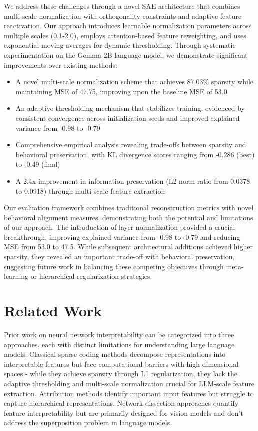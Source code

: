\documentclass{article} %
\begin{document}
We address these challenges through a novel SAE architecture that combines multi-scale normalization with orthogonality constraints and adaptive feature reactivation. Our approach introduces learnable normalization parameters across multiple scales (0.1-2.0), employs attention-based feature reweighting, and uses exponential moving averages for dynamic thresholding. Through systematic experimentation on the Gemma-2B language model, we demonstrate significant improvements over existing methods:

\begin{itemize}
    \item A novel multi-scale normalization scheme that achieves 87.03\% sparsity while maintaining MSE of 47.75, improving upon the baseline MSE of 53.0
    \item An adaptive thresholding mechanism that stabilizes training, evidenced by consistent convergence across initialization seeds and improved explained variance from -0.98 to -0.79
    \item Comprehensive empirical analysis revealing trade-offs between sparsity and behavioral preservation, with KL divergence scores ranging from -0.286 (best) to -0.49 (final)
    \item A 2.4x improvement in information preservation (L2 norm ratio from 0.0378 to 0.0918) through multi-scale feature extraction
\end{itemize}

Our evaluation framework combines traditional reconstruction metrics with novel behavioral alignment measures, demonstrating both the potential and limitations of our approach. The introduction of layer normalization provided a crucial breakthrough, improving explained variance from -0.98 to -0.79 and reducing MSE from 53.0 to 47.5. While subsequent architectural additions achieved higher sparsity, they revealed an important trade-off with behavioral preservation, suggesting future work in balancing these competing objectives through meta-learning or hierarchical regularization strategies.

\section{Related Work}
\label{sec:related}

Prior work on neural network interpretability can be categorized into three approaches, each with distinct limitations for understanding large language models. Classical sparse coding methods \cite{Olshausen1996EmergenceOS} decompose representations into interpretable features but face computational barriers with high-dimensional spaces - while they achieve sparsity through L1 regularization, they lack the adaptive thresholding and multi-scale normalization crucial for LLM-scale feature extraction. Attribution methods \cite{Sundararajan2017AxiomaticAF,Zeiler2013VisualizingAU} identify important input features but struggle to capture hierarchical representations. Network dissection approaches \cite{Bau2017NetworkDQ} quantify feature interpretability but are primarily designed for vision models and don't address the superposition problem in language models.
\end{document}
